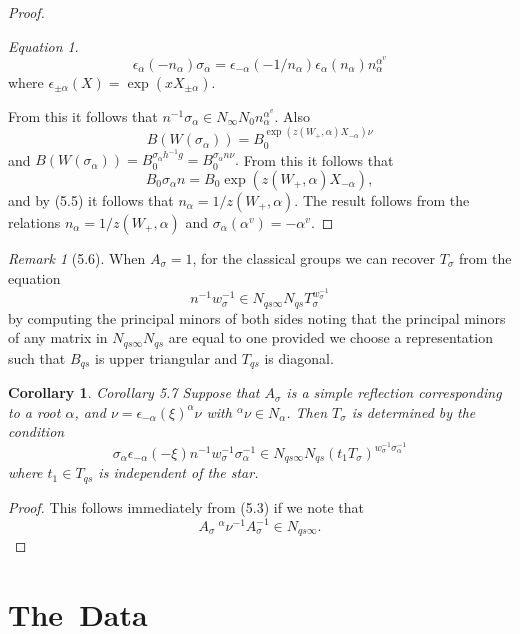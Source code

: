 \documentclass{memo-l}
\newtheorem{corollary}[theorem]{Corollary}
\theoremstyle{definition}
\theoremstyle{remark}
\newtheorem{remark}[theorem]{Remark}
\newtheorem{eqn}[theorem]{Equation}
\numberwithin{section}{chapter}
\numberwithin{equation}{chapter}
\begin{document}
\begin{proof}
\begin{eqn} %
$$\epsilon_\alpha(-n_{{\alpha}})
{\sigma}_{{\alpha}} = {\epsilon}_{-{\alpha}}(-1/n_{{\alpha}})
{\epsilon}_{{\alpha}}(n_{{\alpha}})n_{{\alpha}}^{\alpha^v}$$
where $\epsilon_{\pm\alpha}(X) = \exp(x X_{\pm\alpha})$.
\end{eqn}

\noindent
From this it follows that $n^{-1}{\sigma}_{{\alpha}} \in
N_{{\infty}}N_{0}n_{{\alpha}}^{\alpha^v}.$  Also
$$
B(W({\sigma}_{{\alpha}})) = B_{0}^{\exp(z(W_{+},{\alpha})X_{-{\alpha}})\nu}
$$
and $B(W({\sigma}_{{\alpha}})) = B_{0}^{\sigma_\alpha h^{-1}g}
= B_{0}^{\sigma_\alpha n{\nu}}.$  From this it follows that
$$
B_{0}{\sigma}_{{\alpha}}n = B_{0}\exp(z(W_{+},{\alpha})X_{-{\alpha}}) ,
$$
and by (5.5) it follows that $n_{{\alpha}} = 1/z(W_{+},{\alpha})$.
 The result follows from the relations $n_{{\alpha}} = 1/z(W_{+},{\alpha})$
and ${\sigma}_{{\alpha}}({\alpha}^{v}) = -{\alpha}^{v}$.
\end{proof} 

\begin{remark}[5.6]    When $A_{{\sigma}} = 1$, for the classical
groups we can recover $T_{{\sigma}}$ from the equation $$n^{-1}w_{{\sigma}}^{-1}
\in N_{qs{\infty}}N_{qs}T_{{\sigma}}^{w_\sigma^{-1}}$$  by computing
the principal minors of both sides noting that the principal minors of any
matrix in $N_{qs{\infty}}N_{qs}$ are equal to one provided we choose a
representation such that $B_{qs}$ is upper triangular and $T_{qs}$ is diagonal.
\end{remark}

\begin{corollary}{Corollary 5.7}    Suppose that $A_{{\sigma}}$ is a simple reflection
corresponding to a root ${\alpha}$, and ${\nu} =
{\epsilon}_{-{\alpha}}({\xi})^{{\alpha}}{\nu}$ with $^{{\alpha}}{\nu} \in
N_{{\alpha}}$.
 Then $T_{{\sigma}}$ is determined by the condition
$$
\sigma_{{\alpha}}{\epsilon}_{-{\alpha}}(-{\xi})n^{-1}w_{{\sigma}}^{-1}
{\sigma}_{{\alpha}}^{-1} \in
N_{qs{\infty}}N_{qs}(t_{1}T_{{\sigma}})^{w_\sigma^{-1}{\sigma}_{{\alpha}}^{-1}}
$$
where $t_{1} \in T_{qs}$ is independent of the star.
\end{corollary}

\begin{proof}   This follows immediately from (5.3) if we note that
$$A_{{\sigma}}\ {}^{{\alpha}}{\nu}^{-1}A_{{\sigma}}^{-1} \in N_{qs{\infty}}.$$
\end{proof} 


\section{{The\ Data}}
\end{document}
